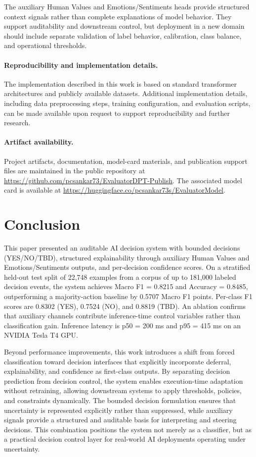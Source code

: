 \documentclass[11pt]{article}
\begin{document}
The auxiliary Human Values and Emotions/Sentiments heads provide structured context signals rather
than complete explanations of model behavior. They support auditability and downstream control, but
deployment in a new domain should include separate validation of label behavior, calibration, class
balance, and operational thresholds.

\paragraph{Reproducibility and implementation details.}
The implementation described in this work is based on standard transformer architectures and
publicly available datasets. Additional implementation details, including data preprocessing steps,
training configuration, and evaluation scripts, can be made available upon request to support
reproducibility and further research.

\paragraph{Artifact availability.}
Project artifacts, documentation, model-card materials, and publication support files are maintained
in the public repository at \url{https://github.com/pcsankar73/EvaluatorDPT-Publish}. The associated
model card is available at \url{https://huggingface.co/pcsankar73s/EvaluatorModel}.

\section{Conclusion}

This paper presented an auditable AI decision system with bounded decisions
(YES/NO/TBD), structured explainability through auxiliary Human Values and
Emotions/Sentiments outputs, and per-decision confidence scores. On a stratified
held-out test split of 22,748 examples from a corpus of up to 181,000 labeled
decision events, the system achieves Macro F1 = 0.8215 and Accuracy = 0.8485,
outperforming a majority-action baseline by 0.5707 Macro F1 points. Per-class
F1 scores are 0.8302 (YES), 0.7524 (NO), and 0.8819 (TBD). An ablation
confirms that auxiliary channels contribute inference-time control variables
rather than classification gain. Inference latency is p50 = 200 ms and
p95 = 415 ms on an NVIDIA Tesla T4 GPU.

Beyond performance improvements, this work introduces a shift from forced classification 
toward decision interfaces that explicitly incorporate deferral, explainability, 
and confidence as first-class outputs. By separating decision prediction from decision 
control, the system enables execution-time adaptation without retraining, allowing 
downstream systems to apply thresholds, policies, and constraints dynamically. 
The bounded decision formulation ensures that uncertainty is represented explicitly 
rather than suppressed, while auxiliary signals provide a structured and auditable basis 
for interpreting and steering decisions. This combination positions the system not merely 
as a classifier, but as a practical decision control layer for real-world AI deployments 
operating under uncertainty.



\end{document}
